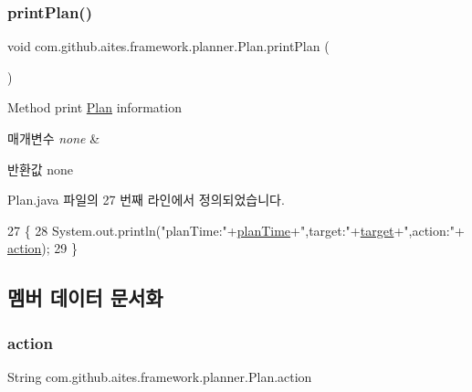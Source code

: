 \subsubsection{\texorpdfstring{print\+Plan()}{printPlan()}}
{\footnotesize\ttfamily void com.\+github.\+aites.\+framework.\+planner.\+Plan.\+print\+Plan (\begin{DoxyParamCaption}{ }\end{DoxyParamCaption})}



Method print \mbox{\hyperlink{classcom_1_1github_1_1aites_1_1framework_1_1planner_1_1_plan}{Plan}} information 


\begin{DoxyParams}{매개변수}
{\em none} & \\
\hline
\end{DoxyParams}
\begin{DoxyReturn}{반환값}
none 
\end{DoxyReturn}


Plan.\+java 파일의 27 번째 라인에서 정의되었습니다.


\begin{DoxyCode}
27                            \{
28         System.out.println(\textcolor{stringliteral}{"planTime:"}+\mbox{\hyperlink{classcom_1_1github_1_1aites_1_1framework_1_1planner_1_1_plan_a4729359a276d3dda6350a16233754f9e}{planTime}}+\textcolor{stringliteral}{",target:"}+\mbox{\hyperlink{classcom_1_1github_1_1aites_1_1framework_1_1planner_1_1_plan_a3f45ee392c1af51834376a138bf8f325}{target}}+\textcolor{stringliteral}{",action:"}+
      \mbox{\hyperlink{classcom_1_1github_1_1aites_1_1framework_1_1planner_1_1_plan_a7b7babde3735425a6e14a679bff3150c}{action}});
29     \}
\end{DoxyCode}


\subsection{멤버 데이터 문서화}
\mbox{\label{classcom_1_1github_1_1aites_1_1framework_1_1planner_1_1_plan_a7b7babde3735425a6e14a679bff3150c}} 
\subsubsection{\texorpdfstring{action}{action}}
{\footnotesize\ttfamily String com.\+github.\+aites.\+framework.\+planner.\+Plan.\+action\hspace{0.3cm}{\ttfamily [private]}}



